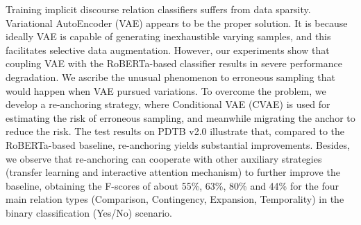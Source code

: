 Training implicit discourse relation classifiers suffers from data sparsity. Variational AutoEncoder (VAE) appears to be the proper solution. It is because ideally VAE is capable of generating inexhaustible varying samples, and this facilitates selective data augmentation. However, our experiments show that coupling VAE with the RoBERTa-based classifier results in severe performance degradation.  We ascribe the unusual phenomenon to erroneous sampling that would happen when VAE pursued variations. To overcome the problem, we develop a re-anchoring strategy, where Conditional VAE (CVAE) is used for estimating the risk of erroneous sampling, and meanwhile migrating the anchor to reduce the risk. The test results on PDTB v2.0 illustrate that, compared to the RoBERTa-based baseline, re-anchoring yields substantial improvements.  Besides, we observe that re-anchoring can cooperate with other auxiliary strategies (transfer learning and interactive attention mechanism) to further improve the baseline, obtaining the F-scores of about 55\%, 63\%, 80\% and 44\% for the four main relation types (Comparison, Contingency, Expansion, Temporality) in the binary classification (Yes/No) scenario.
